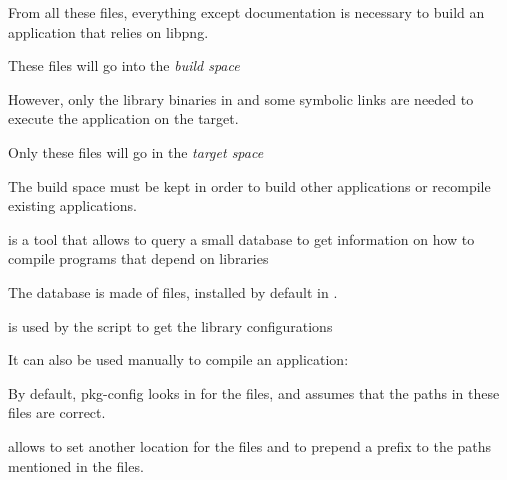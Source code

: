   \startitemize
  \item From all these files, everything except documentation is
    necessary to build an application that relies on libpng.
    \startitemize
    \item These files will go into the {\em build space}
    \stopitemize
  \item However, only the library  binaries in
     and some symbolic links are needed to execute
    the application on the target.
    \startitemize
    \item Only these files will go in the {\em target space}
    \stopitemize
  \item The build space must be kept in order to build other
    applications or recompile existing applications.
  \stopitemize

  \startitemize
  \item {} is a tool that allows to query a small
    database to get information on how to compile programs that depend
    on libraries
  \item The database is made of  files, installed by default in
    .
  \item {} is used by the  script to get the
    library configurations
  \item It can also be used manually to compile an application:\\
  \item By default, pkg-config looks in  for
    the  files, and assumes that the paths in these files
    are correct.
  \item {} allows to set another location for the
     files and  to prepend a
    prefix to the paths mentioned in the  files.
  \stopitemize

